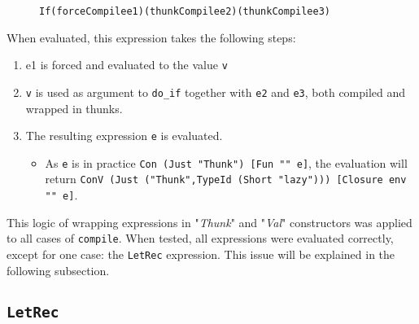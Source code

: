 \begin{figure}[H]
\begin{alltt}
  If (forceCompile e1) (thunkCompile e2) (thunkCompile e3)
\end{alltt}
\end{figure}

\noindent When evaluated, this expression takes the following steps:

\begin{enumerate}
\item e1 is forced and evaluated to the value \texttt{v}
\item \texttt{v} is used as argument to \texttt{do\_if} together with \texttt{e2} and \texttt{e3}, both compiled and wrapped in thunks.
\item The resulting expression \texttt{e} is evaluated.
  \begin{itemize}
    \item As \texttt{e} is in practice \texttt{Con (Just "Thunk") [Fun "" e]}, the evaluation will return \texttt{ConV (Just ("Thunk",TypeId (Short "lazy"))) [Closure env "" e]}.
  \end{itemize}
\end{enumerate}

This logic of wrapping expressions in "\textit{Thunk}" and "\textit{Val}"
constructors was applied to all cases of \texttt{compile}. When tested, all
expressions were evaluated correctly, except for one case: the \texttt{LetRec}
expression. This issue will be explained in the following subsection.

\subsection{\texttt{LetRec}}
